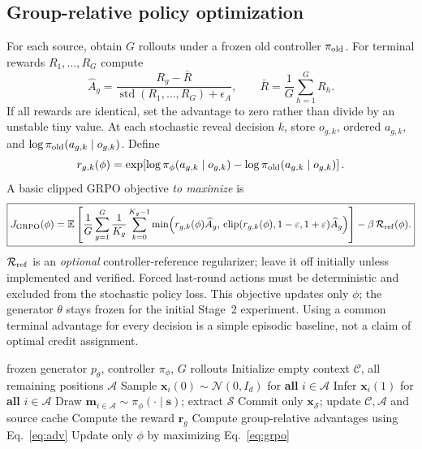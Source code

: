 \documentclass[11pt,a4paper]{article}
\newcommand{\C}{\mathcal C}
\newcommand{\A}{\mathcal A}
\newcommand{\Sset}{\mathcal S}
\newcommand{\E}{\mathbb E}
\begin{document}
\subsection{Group-relative policy optimization}
For each source, obtain $G$ rollouts under a frozen old controller $\pi_{\rm old}$. For terminal rewards $R_1,\ldots,R_G$ compute
\begin{equation}
\widehat A_g=\frac{R_g-\bar R}{\operatorname{std}(R_1,\ldots,R_G)+\epsilon_A},\qquad
\bar R=\frac1G\sum_{h=1}^G R_h.\label{eq:adv}
\end{equation}
If all rewards are identical, set the advantage to zero rather than divide by an unstable tiny value. At each stochastic reveal decision $k$, store $o_{g,k}$, ordered $a_{g,k}$, and $\log\pi_{\rm old}(a_{g,k}\mid o_{g,k})$. Define
\begin{equation}
 r_{g,k}(\phi)=\exp\!\left[\log\pi_\phi(a_{g,k}\mid o_{g,k})-
 \log\pi_{\rm old}(a_{g,k}\mid o_{g,k})\right].
\end{equation}
A basic clipped GRPO objective \emph{to maximize} is
\begin{equation}
\boxed{J_{\rm GRPO}(\phi)=\E\left[
\frac1G\sum_{g=1}^G \frac{1}{K_g}\sum_{k=0}^{K_g-1}
\min\!\left(r_{g,k}(\phi)\widehat A_g,\,
\operatorname{clip}(r_{g,k}(\phi),1-\varepsilon,1+\varepsilon)\widehat A_g\right)
\right]-\beta\,\mathcal R_{\rm ref}(\phi).}\label{eq:grpo}
\end{equation}
$\mathcal R_{\rm ref}$ is an \emph{optional} controller-reference regularizer; leave it off initially unless implemented and verified. Forced last-round actions must be deterministic and excluded from the stochastic policy loss. This objective updates only $\phi$; the generator $\theta$ stays frozen for the initial Stage~2 experiment. Using a common terminal advantage for every decision is a simple episodic baseline, not a claim of optimal credit assignment.

\begin{algorithm}[htbp]
\caption{Stage 2: Train the policy $\pi_{\phi}$}\label{alg:rl}
\begin{algorithmic}[1]
\Require frozen generator $p_{\theta}$, controller $\pi_\phi$, $G$ rollouts
  \State Initialize empty context $\C$, all remaining positions $\A$
  \While{$\A\ne\varnothing$}
    \State Sample $\bm{x}_{i}(0) \sim \mathcal{N}(0, I_d)$ for \textbf{all} $i \in \A$
    \State Infer $\bm{x}_i(1)$ for \textbf{all} $i \in \A$
    \State Draw  $\bm{m}_{i\in \A}\sim\pi_\phi(\cdot\mid \bm{s})$; extract $\Sset$
    \State Commit only $\bm{x}_{\Sset}$; update $\C,\A$ and source cache
  \EndWhile
  \State Compute the reward $\bm{r}_{g}$
\EndFor
\State Compute group-relative advantages using Eq.~\eqref{eq:adv}
\State Update only $\phi$ by maximizing Eq.~\eqref{eq:grpo}
\end{algorithmic}
\end{algorithm}
\end{document}
